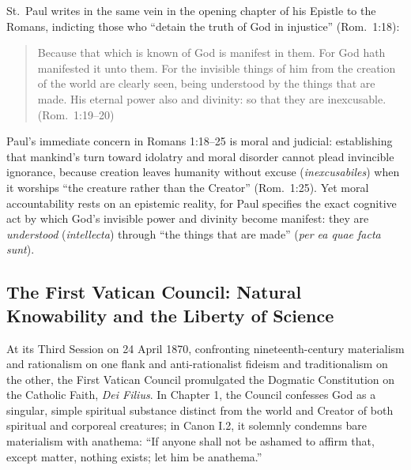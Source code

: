St.\ Paul writes in the same vein in the opening chapter of his Epistle to the Romans, indicting those who ``detain the truth of God in injustice'' (Rom.\ 1:18):

\begin{quote}
Because that which is known of God is manifest in them. For God hath manifested it unto them. For the invisible things of him from the creation of the world are clearly seen, being understood by the things that are made. His eternal power also and divinity: so that they are inexcusable. (Rom.\ 1:19--20)
\end{quote}

Paul's immediate concern in Romans 1:18--25 is moral and judicial: establishing that mankind's turn toward idolatry and moral disorder cannot plead invincible ignorance, because creation leaves humanity without excuse (\emph{inexcusabiles}) when it worships ``the creature rather than the Creator'' (Rom.\ 1:25). Yet moral accountability rests on an epistemic reality, for Paul specifies the exact cognitive act by which God's invisible power and divinity become manifest: they are \emph{understood} (\emph{intellecta}) through ``the things that are made'' (\emph{per ea quae facta sunt}).

\subsection{The First Vatican Council: Natural Knowability and the Liberty of Science}

At its Third Session on 24 April 1870, confronting nineteenth-century materialism and rationalism on one flank and anti-rationalist fideism and traditionalism on the other, the First Vatican Council promulgated the Dogmatic Constitution on the Catholic Faith, \emph{Dei Filius}. In Chapter 1, the Council confesses God as a singular, simple spiritual substance distinct from the world and Creator of both spiritual and corporeal creatures; in Canon I.2, it solemnly condemns bare materialism with anathema: ``If anyone shall not be ashamed to affirm that, except matter, nothing exists; let him be anathema.''

